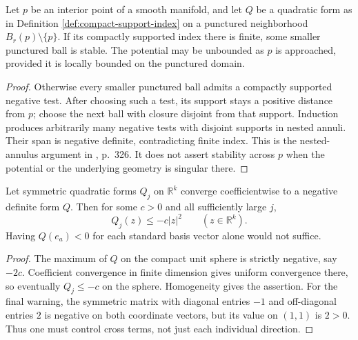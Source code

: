 \begin{proposition}\label{prop:finite-index-stable-puncture}
Let $p$ be an interior point of a smooth manifold, and let $Q$ be a quadratic form as in Definition \ref{def:compact-support-index} on a punctured neighborhood $B_r(p)\setminus\{p\}$. If its compactly supported index there is finite, some smaller punctured ball is stable. The potential may be unbounded as $p$ is approached, provided it is locally bounded on the punctured domain.
\end{proposition}
\begin{proof}
Otherwise every smaller punctured ball admits a compactly supported negative test. After choosing such a test, its support stays a positive distance from $p$; choose the next ball with closure disjoint from that support. Induction produces arbitrarily many negative tests with disjoint supports in nested annuli. Their span is negative definite, contradicting finite index. This is the nested-annulus argument in \cite{Sharp17}, p.~326. It does not assert stability across $p$ when the potential or the underlying geometry is singular there.
\end{proof}

\begin{lemma}\label{lem:negative-form-persistence}
Let symmetric quadratic forms $Q_j$ on $\mathbb R^k$ converge coefficientwise to a negative definite form $Q$. Then for some $c>0$ and all sufficiently large $j$,
\[
 Q_j(z)\leq-c|z|^2\qquad(z\in\mathbb R^k).
\]
Having $Q(e_a)<0$ for each standard basis vector alone would not suffice.
\end{lemma}
\begin{proof}
The maximum of $Q$ on the compact unit sphere is strictly negative, say $-2c$. Coefficient convergence in finite dimension gives uniform convergence there, so eventually $Q_j\leq-c$ on the sphere. Homogeneity gives the assertion. For the final warning, the symmetric matrix with diagonal entries $-1$ and off-diagonal entries $2$ is negative on both coordinate vectors, but its value on $(1,1)$ is $2>0$. Thus one must control cross terms, not just each individual direction.
\end{proof}

